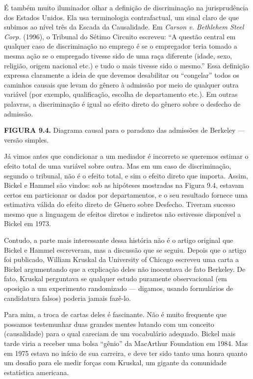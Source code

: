 \documentclass[11pt,a5paper,twoside]{book}
\begin{document}
É também muito iluminador olhar a definição de discriminação na jurisprudência dos Estados Unidos. Ela usa terminologia contrafactual, um sinal claro de que subimos ao nível três da Escada da Causalidade. Em \textit{Carson v. Bethlehem Steel Corp.} (1996), o Tribunal do Sétimo Circuito escreveu: “A questão central em qualquer caso de discriminação no emprego é se o empregador teria tomado a mesma ação se o empregado tivesse sido de uma raça diferente (idade, sexo, religião, origem nacional etc.) e tudo o mais tivesse sido o mesmo.” Essa definição expressa claramente a ideia de que devemos desabilitar ou “congelar” todos os caminhos causais que levam do gênero à admissão por meio de qualquer outra variável (por exemplo, qualificação, escolha de departamento etc.). Em outras palavras, a discriminação é igual ao efeito direto do gênero sobre o desfecho de admissão.

\textbf{FIGURA 9.4.} Diagrama causal para o paradoxo das admissões de Berkeley — versão simples.

Já vimos antes que condicionar a um mediador é incorreto se queremos estimar o efeito total de uma variável sobre outra. Mas em um caso de discriminação, segundo o tribunal, não é o efeito total, e sim o efeito direto que importa. Assim, Bickel e Hammel são vindos: sob as hipóteses mostradas na Figura 9.4, estavam certos em particionar os dados por departamentos, e o seu resultado fornece uma estimativa válida do efeito direto de Gênero sobre Desfecho. Tiveram sucesso mesmo que a linguagem de efeitos diretos e indiretos não estivesse disponível a Bickel em 1973.

Contudo, a parte mais interessante dessa história não é o artigo original que Bickel e Hammel escreveram, mas a discussão que se seguiu. Depois que o artigo foi publicado, William Kruskal da University of Chicago escreveu uma carta a Bickel argumentando que a explicação deles não inocentava de fato Berkeley. De fato, Kruskal perguntava se qualquer estudo puramente observacional (em oposição a um experimento randomizado — digamos, usando formulários de candidatura falsos) poderia jamais fazê-lo.

Para mim, a troca de cartas deles é fascinante. Não é muito frequente que possamos testemunhar duas grandes mentes lutando com um conceito (causalidade) para o qual careciam de um vocabulário adequado. Bickel mais tarde viria a receber uma bolsa “gênio” da MacArthur Foundation em 1984. Mas em 1975 estava no início de sua carreira, e deve ter sido tanto uma honra quanto um desafio para ele medir forças com Kruskal, um gigante da comunidade estatística americana.
\end{document}
